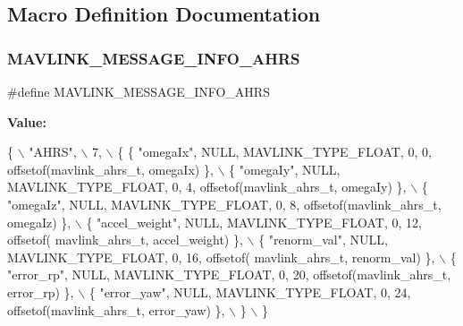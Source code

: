 \subsection{Macro Definition Documentation}
\mbox{\label{mavlink__msg__ahrs_8h_a74b3529c2dfe26cf35c6441e070e2726}} 
\subsubsection{M\+A\+V\+L\+I\+N\+K\+\_\+\+M\+E\+S\+S\+A\+G\+E\+\_\+\+I\+N\+F\+O\+\_\+\+A\+H\+RS}
{\footnotesize\ttfamily \#define M\+A\+V\+L\+I\+N\+K\+\_\+\+M\+E\+S\+S\+A\+G\+E\+\_\+\+I\+N\+F\+O\+\_\+\+A\+H\+RS}

{\bfseries Value\+:}
\begin{DoxyCode}
\{ \(\backslash\)
    \textcolor{stringliteral}{"AHRS"}, \(\backslash\)
    7, \(\backslash\)
    \{  \{ \textcolor{stringliteral}{"omegaIx"}, NULL, MAVLINK_TYPE_FLOAT, 0, 0, offsetof(mavlink_ahrs_t, omegaIx) \}, \(\backslash\)
         \{ \textcolor{stringliteral}{"omegaIy"}, NULL, MAVLINK_TYPE_FLOAT, 0, 4, offsetof(mavlink_ahrs_t, omegaIy) \}, \(\backslash\)
         \{ \textcolor{stringliteral}{"omegaIz"}, NULL, MAVLINK_TYPE_FLOAT, 0, 8, offsetof(mavlink_ahrs_t, omegaIz) \}, \(\backslash\)
         \{ \textcolor{stringliteral}{"accel\_weight"}, NULL, MAVLINK_TYPE_FLOAT, 0, 12, offsetof(
      mavlink_ahrs_t, accel\_weight) \}, \(\backslash\)
         \{ \textcolor{stringliteral}{"renorm\_val"}, NULL, MAVLINK_TYPE_FLOAT, 0, 16, offsetof(
      mavlink_ahrs_t, renorm\_val) \}, \(\backslash\)
         \{ \textcolor{stringliteral}{"error\_rp"}, NULL, MAVLINK_TYPE_FLOAT, 0, 20, offsetof(mavlink_ahrs_t, error\_rp) \}, \(\backslash\)
         \{ \textcolor{stringliteral}{"error\_yaw"}, NULL, MAVLINK_TYPE_FLOAT, 0, 24, offsetof(mavlink_ahrs_t, error\_yaw) \}, \(\backslash\)
         \} \(\backslash\)
\}
\end{DoxyCode}
\mbox{\label{mavlink__msg__ahrs_8h_aabcc6ddd786cae826c1e7ca989440984}} 
